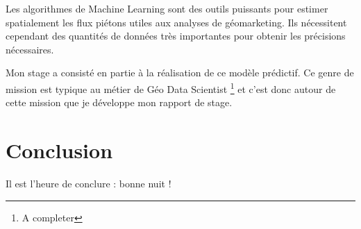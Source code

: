 \documentclass{themeensg}
\begin{document}
Les algorithmes de Machine Learning sont des outils puissants pour estimer spatialement les flux piétons utiles aux analyses de géomarketing. Ils nécessitent cependant des quantités de données très importantes pour obtenir les précisions nécessaires.

Mon stage a consisté en partie à la réalisation de ce modèle prédictif. Ce genre de mission est typique au métier de Géo Data Scientist \footnote{A completer} et c’est donc autour de cette mission que je développe mon rapport de stage.











\chapter*{Conclusion}
  \vspace{1.5cm}
Il est l'heure de conclure : bonne nuit !


\newevenpage
\printbibliography[title={Bibliographie}]
\nocite{*}

\newevenpage
\listoffigures

\newevenpage
\listoftables
\end{document}
